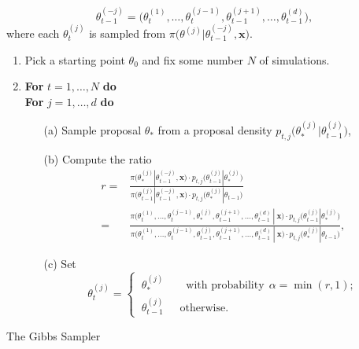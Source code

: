 \begin{equation*}
\theta_{t-1}^{(-j)}=\Big(\theta_t^{(1)},\dots,\theta_t^{(j-1)},\theta_{t-1}^{(j+1)},\dots,\theta_{t-1}^{(d)}\Big),
\end{equation*} 
where each $\theta_t^{(j)}$ is sampled from $\pi\Big(\theta^{(j)}|\theta_{t-1}^{(-j)},\boldsymbol{x}\Big)$. 

\begin{algorithm}[H]
	\SetAlgoLined
	\begin{enumerate}
		\item Pick a starting point $\theta_0$ and fix some number $N$ of simulations.
		\item \textbf{For} $t=1,\dots,N$ \qquad \textbf{do} \\
		\quad \textbf{For} $j=1,\dots,d$ \qquad \textbf{do}
		\begin{itemize}
			\item[(a)] Sample proposal $\theta_*$ from a proposal density $p_{t,j}\Big(\theta^{(j)}_*|\theta^{(j)}_{t-1}\Big)$,
			\item[(b)] Compute the ratio
			\begin{equation}\label{eq:gibalgo}
			\begin{aligned}
				r = & \frac{\pi\Big(\theta^{(j)}_*|\theta_{t-1}^{(-j)},\boldsymbol{x}\Big)\cdot p_{t,j}\Big(\theta^{(j)}_{t-1}|\theta^{(j)}_*\Big)}{\pi\Big(\theta_{t-1}^{(j)}|\theta_{t-1}^{(-j)},\boldsymbol{x}\Big)\cdot p_{t,j}\Big(\theta^{(j)}_*|\theta_{t-1}\Big)} \\
				= & \frac{\pi\Big(\theta_t^{(1)},\dots,\theta_t^{(j-1)},\theta^{(j)}_*, \theta_{t-1}^{(j+1)},\dots,\theta_{t-1}^{(d)} \ | \ \boldsymbol{x}\Big)\cdot  p_{t,j}\Big(\theta_{t-1}^{(j)}|\theta_*^{(j)}\Big)}{\pi\Big(\theta_t^{(1)},\dots,\theta_t^{(j-1)},\theta^{(j)}_{t-1}, \theta_{t-1}^{(j+1)},\dots,\theta_{t-1}^{(d)}\ |\ \boldsymbol{x}\Big)\cdot  p_{t,j}\Big(\theta_{*}^{(j)}|\theta_{t-1}\Big)},
		\end{aligned}
			\end{equation}
			\item[(c)] Set 
			\begin{equation*}
			\theta_t^{(j)}= 			\begin{cases} \ \theta_*^{(j)} \qquad \text{with probability} \ \  \alpha=\min (r,1); \\
			\ \theta_{t-1}^{(j)} \ \ \quad \text{otherwise}.
			\end{cases}
			\end{equation*}
		\end{itemize}
	\end{enumerate}
	\caption{The Gibbs Sampler}\label{algo:gib}
\end{algorithm}

